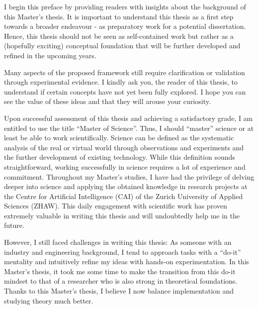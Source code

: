 \small
I begin this preface by providing readers with insights about the background of this Master's thesis.
It is important to understand this thesis as a first step towards a broader endeavour - as preparatory work for a potential dissertation.
Hence, this thesis should not be seen as self-contained work but rather as a (hopefully exciting) conceptual foundation that will be further developed and refined in the upcoming years.

Many aspects of the proposed framework still require clarification or validation through experimental evidence. I kindly ask you, the reader of this thesis, to understand if certain concepts have not yet been fully explored. I hope you can see the value of these ideas and that they will arouse your curiosity.

Upon successful assessment of this thesis and achieving a satisfactory grade, I am entitled to use the title ``Master of Science''.
Thus, I should ``master'' science or at least be able to work scientifically.
Science can be defined as the systematic analysis of the real or virtual world through observations and experiments and the further development of existing technology.
While this definition sounds straightforward, working successfully in science requires a lot of experience and commitment.
Throughout my Master's studies, I have had the privilege of delving deeper into science and applying the obtained knowledge in research projects at the Centre for Artificial Intelligence (CAI) of the Zurich University of Applied Sciences (ZHAW).
This daily engagement with scientific work has proven extremely valuable in writing this thesis and will undoubtedly help me in the future.

However, I still faced challenges in writing this thesis:
As someone with an industry and engineering background, I tend to approach tasks with a ``do-it'' mentality and intuitively refine my ideas with hands-on experimentation. 
In this Master's thesis, it took me some time to make the transition from this do-it mindset to that of a researcher who is also strong in theoretical foundations. Thanks to this Master's thesis, I believe I now balance implementation and studying theory much better.

